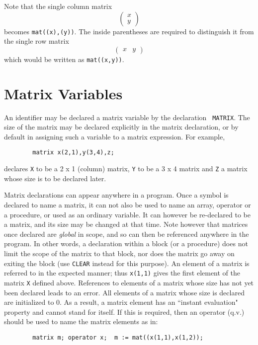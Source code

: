 Note that the single column matrix
\[ \left( \begin{array}{c} x \\ y \end{array} \right) \]
becomes {\tt mat((x),(y))}.  The inside parentheses are required to
distinguish it from the single row matrix
\[ \left( \begin{array}{lr} x & y \end{array} \right) \]
which would be written as {\tt mat((x,y))}.

\section{Matrix Variables}

An identifier may be declared a matrix variable by the declaration {\tt
MATRIX}.
The size of the matrix may be declared explicitly in the matrix
declaration, or by default in assigning such a variable to a matrix
expression. For example,
\begin{verbatim}
        matrix x(2,1),y(3,4),z;
\end{verbatim}
declares {\tt X} to be a 2 x 1 (column) matrix, {\tt Y} to be a 3 x 4
matrix and {\tt Z} a matrix whose size is to be declared later.

Matrix declarations can appear anywhere in a program. Once a symbol is
declared to name a matrix, it can not also be used to name an array,
operator or a procedure, or used as an ordinary variable. It can however
be re-declared to be a matrix, and its size may be changed at that time.
Note however that matrices once declared are {\em global} in scope, and so
can then be referenced anywhere in the program.  In other words, a
declaration within a block (or a procedure) does not limit the scope of
the matrix to that block, nor does the matrix go away on exiting the block
(use {\tt CLEAR} instead for this purpose).  An element of a matrix is
referred to in the expected manner; thus {\tt x(1,1)} gives the first
element of the matrix {\tt X} defined above.  References to elements of a
matrix whose size has not yet been declared leads to an error.  All
elements of a matrix whose size is declared are initialized to 0.  As a
result, a matrix element has an ``instant evaluation"  property and cannot stand for itself.  If this is required,
then an operator (q.v.) should be used to name the matrix elements as in:
\begin{verbatim}
        matrix m; operator x;  m := mat((x(1,1),x(1,2));
\end{verbatim}

